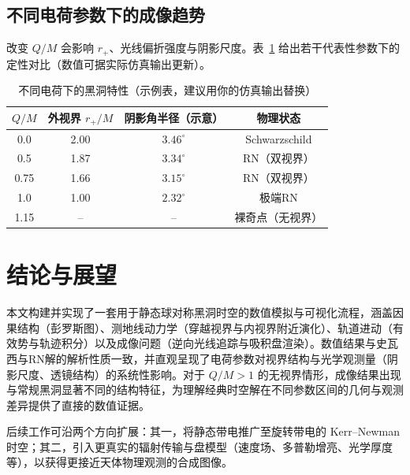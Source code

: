 \documentclass[a4paper,12pt]{article}
\begin{document}
\subsection{不同电荷参数下的成像趋势}

改变 $Q/M$ 会影响 $r_+$、光线偏折强度与阴影尺度。表~\ref{tab:charge} 给出若干代表性参数下的定性对比（数值可据实际仿真输出更新）。

\begin{table}[H]
\centering
\caption{不同电荷下的黑洞特性（示例表，建议用你的仿真输出替换）}
\label{tab:charge}
\begin{tabular}{cccc}
\toprule
$Q/M$ & 外视界 $r_+/M$ & 阴影角半径（示意） & 物理状态 \\
\midrule
0.0  & 2.00 & $3.46^\circ$ & Schwarzschild \\
0.5  & 1.87 & $3.34^\circ$ & RN（双视界） \\
0.75 & 1.66 & $3.15^\circ$ & RN（双视界） \\
1.0  & 1.00 & $2.32^\circ$ & 极端RN \\
1.15 & --   & --           & 裸奇点（无视界） \\
\bottomrule
\end{tabular}
\end{table}


\section{结论与展望}

本文构建并实现了一套用于静态球对称黑洞时空的数值模拟与可视化流程，涵盖因果结构（彭罗斯图）、测地线动力学（穿越视界与内视界附近演化）、轨道进动（有效势与轨迹积分）以及成像问题（逆向光线追踪与吸积盘渲染）。数值结果与史瓦西与RN解的解析性质一致，并直观呈现了电荷参数对视界结构与光学观测量（阴影尺度、透镜结构）的系统性影响。对于 $Q/M>1$ 的无视界情形，成像结果出现与常规黑洞显著不同的结构特征，为理解经典时空解在不同参数区间的几何与观测差异提供了直接的数值证据。

后续工作可沿两个方向扩展：其一，将静态带电推广至旋转带电的 Kerr--Newman 时空；其二，引入更真实的辐射传输与盘模型（速度场、多普勒增亮、光学厚度等），以获得更接近天体物理观测的合成图像。
\end{document}

